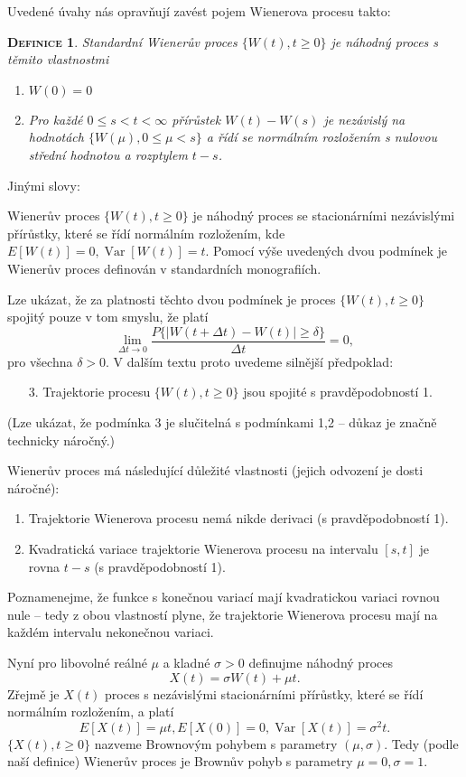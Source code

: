 \documentclass[10pt]{article}
\newtheorem{mydef}{\textsc{Definice}}
\DeclareMathOperator*{\var}{Var}
\begin{document}
Uvedené úvahy nás opravňují zavést pojem Wienerova procesu takto:
\begin{mydef}
Standardní Wienerův proces $\{W(t), t \geq 0\}$ je náhodný proces s těmito vlastnostmi
\begin{enumerate}
\item $W(0)=0$
\item Pro každé $0 \leq s<t<\infty$ přírůstek $W(t)-W(s)$ je nezávislý na hodnotách $\{W(\mu), 0 \leq \mu < s\}$ a řídí se normálním rozložením s nulovou střední hodnotou a rozptylem $t-s$.
\end{enumerate}
\end{mydef}
Jinými slovy:

Wienerův proces $\{W(t), t \geq 0\}$ je náhodný proces se stacionárními nezávislými přírůstky, které se řídí normálním rozložením, kde $E[W(t)] = 0, \var[W(t)]=t.$ Pomocí výše uvedených dvou podmínek je Wienerův proces definován v standardních monografiích.

Lze ukázat, že za platnosti těchto dvou podmínek je proces $\{W(t), t \geq 0\}$ spojitý pouze v tom smyslu, že platí 
$$\lim_{\Delta t \to 0} \frac{P\{|W(t+\Delta t) - W(t)| \geq \delta\}}{\Delta t} = 0,$$
pro všechna $\delta>0$. V dalším textu proto uvedeme silnější předpoklad:
\begin{enumerate}
\item[3.] Trajektorie procesu $\{W(t), t \geq 0\}$ jsou spojité s pravděpodobností 1.
\end{enumerate}
(Lze ukázat, že podmínka 3 je slučitelná s podmínkami 1,2 -- důkaz je značně technicky náročný.)

Wienerův proces má následující důležité vlastnosti (jejich odvození je dosti náročné):
\begin{enumerate}
\item Trajektorie Wienerova procesu nemá nikde derivaci (s pravděpodobností 1).
\item Kvadratická variace trajektorie Wienerova procesu na intervalu $[s,t]$ je rovna $t-s$ (s pravděpodobností 1).
\end{enumerate}

Poznamenejme, že funkce s konečnou variací mají kvadratickou variaci rovnou nule -- tedy z obou vlastností plyne, že trajektorie Wienerova procesu mají na každém intervalu nekonečnou variaci.

Nyní pro libovolné reálné $\mu$ a kladné $\sigma>0$ definujme náhodný proces $$X(t) = \sigma W(t) + \mu t.$$ Zřejmě je $X(t)$ proces s nezávislými stacionárními přírůstky, které se řídí normálním rozložením, a platí $$E[X(t)]=\mu t, E[X(0)]=0, \var [X(t)] = \sigma^2 t.$$ $\{X(t), t \geq 0\}$ nazveme Brownovým pohybem s parametry $(\mu,\sigma)$. Tedy (podle naší definice) Wienerův proces je Brownův pohyb s parametry $\mu = 0, \sigma = 1$.
\end{document}
